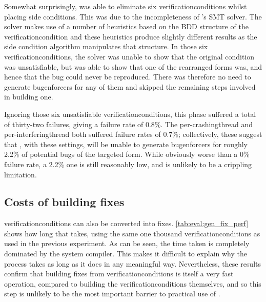 Somewhat surprisingly, {\technique} was able to eliminate six
\glspl{verificationcondition} whilst placing side conditions.  This
was due to the incompleteness of {\technique}'s SMT solver.  The
solver makes use of a number of heuristics based on the BDD structure
of the \gls{verificationcondition} and these heuristics produce
slightly different results as the side condition algorithm manipulates
that structure.  In those six \glspl{verificationcondition}, the
solver was unable to show that the original condition was
unsatisfiable, but was able to show that one of the rearranged forms
was, and hence that the bug could never be reproduced.  There was
therefore no need to generate \glspl{bugenforcer} for any of them and
{\technique} skipped the remaining steps involved in building one.

Ignoring those six unsatisfiable \glspl{verificationcondition}, this
phase suffered a total of thirty-two failures, giving a failure rate
of 0.8\%.  The per-\gls{crashingthread} and
per-\gls{interferingthread} both suffered failure rates of 0.7\%;
collectively, these suggest that {\technique}, with these settings,
will be unable to generate \glspl{bugenforcer} for roughly 2.2\% of
potential bugs of the targeted form.  While obviously worse than a 0\%
failure rate, a 2.2\% one is still reasonably low, and is unlikely to
be a crippling limitation.

\subsection{Costs of building fixes}


\Glspl{verificationcondition} can also be converted into fixes.
\autoref{tab:eval:gen_fix_perf} shows how long that takes, using the
same one thousand \glspl{verificationcondition} as used in the
previous experiment.  As can be seen, the time taken is completely
dominated by the system compiler.  This makes it difficult to explain
why the process takes as long as it does in any meaningful way.
Nevertheless, these results confirm that building fixes from
\glspl{verificationcondition} is itself a very fast operation,
compared to building the \glspl{verificationcondition} themselves, and
so this step is unlikely to be the most important barrier to practical
use of {\technique}.

